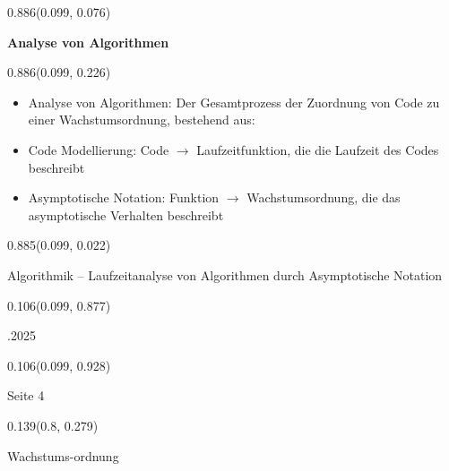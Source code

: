 \documentclass[aspectratio=169]{beamer}
\begin{document}
\begin{frame}[fragile]
\begin{textblock}{0.886}(0.099, 0.076)
  \begin{minipage}[t][0.131\paperheight]{\linewidth}
    \textbf{Analyse von Algorithmen}
  \end{minipage}
\end{textblock}
\begin{textblock}{0.886}(0.099, 0.226)
  \begin{minipage}[b][0.63\paperheight]{\linewidth}
    {\scriptsize
    \begin{itemize}
      \item Analyse von Algorithmen: Der Gesamtprozess der Zuordnung von Code zu einer Wachstumsordnung, bestehend aus:
      \item Code Modellierung: Code $\rightarrow$ Laufzeitfunktion, die die Laufzeit des Codes beschreibt
      \item Asymptotische Notation: Funktion $\rightarrow$ Wachstumsordnung, die das asymptotische Verhalten beschreibt
    \end{itemize}
    }
  \end{minipage}
\end{textblock}
\begin{textblock}{0.885}(0.099, 0.022)
  \begin{minipage}[b][0.031\paperheight]{\linewidth}
    \fontsize{3}{3.3}\selectfont
    Algorithmik – Laufzeitanalyse von Algorithmen durch Asymptotische Notation
  \end{minipage}
\end{textblock}
\begin{textblock}{0.106}(0.099, 0.877)
  \begin{minipage}[b][0.026\paperheight]{\linewidth}
    \raggedright
    \fontsize{3}{3.3}.2025
  \end{minipage}
\end{textblock}
\begin{textblock}{0.106}(0.099, 0.928)
  \begin{minipage}[b][0.031\paperheight]{\linewidth}
    \raggedright
    \fontsize{3}{3.3}\selectfont
    Seite 4
  \end{minipage}
\end{textblock}
\begin{textblock}{0.139}(0.8, 0.279)
  \begin{minipage}[t][0.161\paperheight]{\linewidth}
    \tiny
    Wachstums-ordnung
  \end{minipage}

\end{textblock}
\end{frame}
\end{document}
